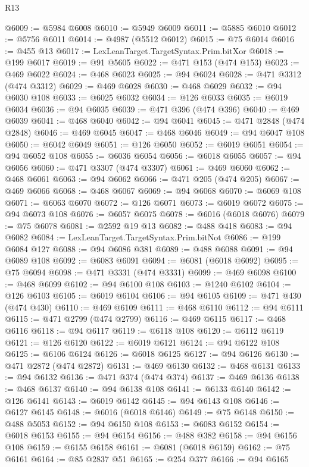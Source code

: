 \begin{lexlean}{R13}
\begin{coremodule}
@6009 := @5984 @6008
@6010 := @5949 @6009
@6011 := @5885 @6010
@6012 := @5756 @6011
@6014 := @4987 (@5512 @6012)
@6015 := @75 @6014
@6016 := @455 @13
@6017 := LexLeanTarget.TargetSyntax.Prim.bitXor
@6018 := @199 @6017
@6019 := @91 @5605
@6022 := @471 @153 (@474 @153)
@6023 := @469 @6022
@6024 := @468 @6023
@6025 := @94 @6024
@6028 := @471 @3312 (@474 @3312)
@6029 := @469 @6028
@6030 := @468 @6029
@6032 := @94 @6030 @108
@6033 := @6025 @6032
@6034 := @126 @6033
@6035 := @6019 @6034
@6036 := @94 @6035
@6039 := @471 @396 (@474 @396)
@6040 := @469 @6039
@6041 := @468 @6040
@6042 := @94 @6041
@6045 := @471 @2848 (@474 @2848)
@6046 := @469 @6045
@6047 := @468 @6046
@6049 := @94 @6047 @108
@6050 := @6042 @6049
@6051 := @126 @6050
@6052 := @6019 @6051
@6054 := @94 @6052 @108
@6055 := @6036 @6054
@6056 := @6018 @6055
@6057 := @94 @6056
@6060 := @471 @3307 (@474 @3307)
@6061 := @469 @6060
@6062 := @468 @6061
@6063 := @94 @6062
@6066 := @471 @205 (@474 @205)
@6067 := @469 @6066
@6068 := @468 @6067
@6069 := @94 @6068
@6070 := @6069 @108
@6071 := @6063 @6070
@6072 := @126 @6071
@6073 := @6019 @6072
@6075 := @94 @6073 @108
@6076 := @6057 @6075
@6078 := @6016 (@6018 @6076)
@6079 := @75 @6078
@6081 := @2592 @19 @13
@6082 := @488 @418
@6083 := @94 @6082
@6084 := LexLeanTarget.TargetSyntax.Prim.bitNot
@6086 := @199 @6084 @127
@6088 := @94 @6086 @381
@6089 := @488 @6088
@6091 := @94 @6089 @108
@6092 := @6083 @6091
@6094 := @6081 (@6018 @6092)
@6095 := @75 @6094
@6098 := @471 @3331 (@474 @3331)
@6099 := @469 @6098
@6100 := @468 @6099
@6102 := @94 @6100 @108
@6103 := @1240 @6102
@6104 := @126 @6103
@6105 := @6019 @6104
@6106 := @94 @6105
@6109 := @471 @430 (@474 @430)
@6110 := @469 @6109
@6111 := @468 @6110
@6112 := @94 @6111
@6115 := @471 @2799 (@474 @2799)
@6116 := @469 @6115
@6117 := @468 @6116
@6118 := @94 @6117
@6119 := @6118 @108
@6120 := @6112 @6119
@6121 := @126 @6120
@6122 := @6019 @6121
@6124 := @94 @6122 @108
@6125 := @6106 @6124
@6126 := @6018 @6125
@6127 := @94 @6126
@6130 := @471 @2872 (@474 @2872)
@6131 := @469 @6130
@6132 := @468 @6131
@6133 := @94 @6132
@6136 := @471 @374 (@474 @374)
@6137 := @469 @6136
@6138 := @468 @6137
@6140 := @94 @6138 @108
@6141 := @6133 @6140
@6142 := @126 @6141
@6143 := @6019 @6142
@6145 := @94 @6143 @108
@6146 := @6127 @6145
@6148 := @6016 (@6018 @6146)
@6149 := @75 @6148
@6150 := @488 @5053
@6152 := @94 @6150 @108
@6153 := @6083 @6152
@6154 := @6018 @6153
@6155 := @94 @6154
@6156 := @488 @382
@6158 := @94 @6156 @108
@6159 := @6155 @6158
@6161 := @6081 (@6018 @6159)
@6162 := @75 @6161
@6164 := @85 @2837 @51
@6165 := @254 @377
@6166 := @94 @6165

\end{coremodule}
\end{lexlean}
